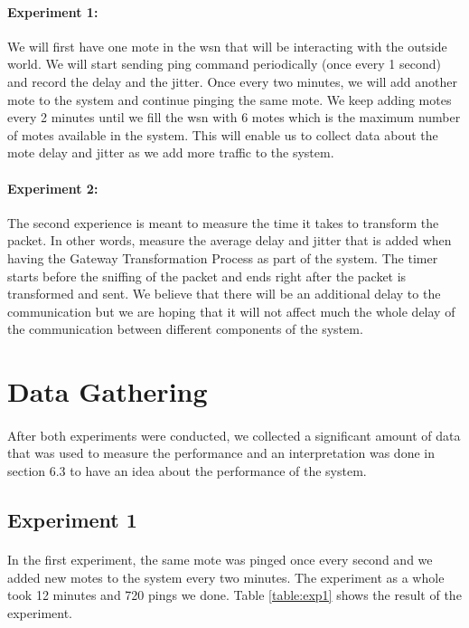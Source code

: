 \documentclass[oneside,12pt,a4paper,final]{book}
\begin{document}
\paragraph{Experiment 1:}
We will first have one mote in the \gls{wsn} that will be interacting with the outside world. We will start sending ping command periodically (once every 1 second) and record the delay and the jitter. Once every two minutes, we will add another mote to the system and continue pinging the same mote. We keep adding motes every 2 minutes until we fill the \gls{wsn} with 6 motes which is the maximum number of motes available in the system. This will enable us to collect data about the mote delay and jitter as we add more traffic to the system.
\paragraph{Experiment 2: }
The second experience is meant to measure the time it takes to transform the packet. In other words, measure the average delay and jitter that is added when having the Gateway Transformation Process as part of the system. The timer starts before the sniffing of the packet and ends right after the packet is transformed and sent.
We believe that there will be an additional delay to the communication but we are hoping that it will not affect much the whole delay of the communication between different components of the system. 
\section{Data Gathering}
\paragraph{}
After both experiments were conducted, we collected a significant amount of data that was used to measure the performance and an interpretation was done in section 6.3 to have an idea about the performance of the system.
\subsection{Experiment 1}
\paragraph{}
In the first experiment, the same mote was pinged once every second and we added new motes to the system every two minutes. The experiment as a whole took 12 minutes and 720 pings we done. Table \ref{table:exp1} shows the result of the experiment.
\end{document}
